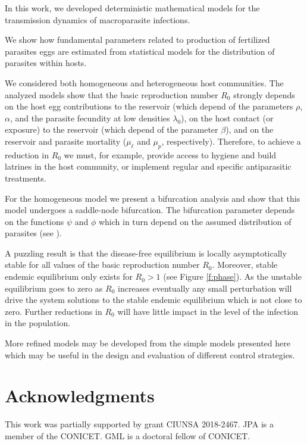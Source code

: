 \documentclass[eng]{MMSB-class-eng}
\begin{document}
{\color{red}

In this work, we developed deterministic mathematical models for the transmission dynamics of macroparasite infections. 

We show how fundamental parameters related to production of fertilized parasites eggs are estimated from statistical models for the distribution of
parasites within hosts.	

We considered both homogeneous and heterogeneous host communities. 
The analyzed models show that the basic reproduction number $R_0$ strongly depends on 
the host egg contributions to the reservoir (which depend of the parameters $\rho$, $\alpha$, and the parasite fecundity at low densities $\lambda_0 $), 
on the host contact (or exposure) to the reservoir (which depend of the parameter $\beta$),  
and on the reservoir and parasite mortality ($\mu_{\ell}$ and $\mu_p$, respectively). 
Therefore, to achieve a reduction in $R_0$ we must, for example, provide access to hygiene and build latrines in the host community, or implement regular and specific antiparasitic treatments.

For the homogeneous model we present a bifurcation analysis and show that this model undergoes a saddle-node bifurcation.
The bifurcation parameter depends on the functions $\psi$ and $\phi$ which in turn depend on the assumed
distribution of parasites (see \citet{lopez2022general}).

{\color{blue}
A puzzling result is that the disease-free equilibrium is locally asymptotically  stable for all values of the basic reproduction number $R_0$.  Moreover, stable endemic equilibrium only exists for $R_0>1$ (see Figure \ref{f:phase}). As the unstable equilibrium goes to zero as $R_0$ increases eventually any small perturbation will drive the system solutions to the stable endemic equilibrium which is not close to zero. Further reductions in $R_0$ will have little impact in the level of the infection in the population. 

}

More refined models may be developed from the simple models presented here which may be useful in the design and evaluation of different control strategies. 

}
\section{Acknowledgments}
This work was partially supported by grant CIUNSA 2018-2467. JPA is a member of the CONICET. GML is a doctoral fellow of CONICET.


\end{document}
